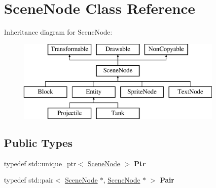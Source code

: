 \hypertarget{class_scene_node}{}\section{Scene\+Node Class Reference}
\label{class_scene_node}
Inheritance diagram for Scene\+Node\+:\begin{figure}[H]
\begin{center}
\leavevmode
\includegraphics[height=4.000000cm]{class_scene_node}
\end{center}
\end{figure}
\subsection*{Public Types}
\begin{DoxyCompactItemize}
\item 
\hypertarget{class_scene_node_aaf5c9ad8475874b51b70e400822f2e9a}{}typedef std\+::unique\+\_\+ptr$<$ \hyperlink{class_scene_node}{Scene\+Node} $>$ {\bfseries Ptr}\label{class_scene_node_aaf5c9ad8475874b51b70e400822f2e9a}

\item 
\hypertarget{class_scene_node_a366efca54698fa3f6eaf80b41e7ff4df}{}typedef std\+::pair$<$ \hyperlink{class_scene_node}{Scene\+Node} $\ast$, \hyperlink{class_scene_node}{Scene\+Node} $\ast$ $>$ {\bfseries Pair}\label{class_scene_node_a366efca54698fa3f6eaf80b41e7ff4df}

\end{DoxyCompactItemize}

